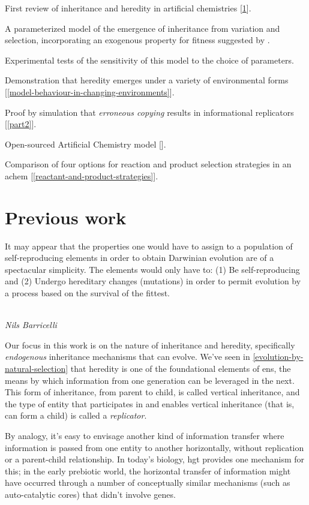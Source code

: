 \begin{compactenum}
\item First review of inheritance and heredity in artificial chemistries [\cref{previous-work}].
\item A parameterized model of the emergence of inheritance from variation and selection, incorporating an exogenous property for fitness suggested by \textcite{Bourrat2015}.
\item Experimental tests of the sensitivity of this model to the choice of parameters.
\item Demonstration that heredity emerges under a variety of environmental forms [\cref{model-behaviour-in-changing-environments}].
\item Proof by simulation that \emph{erroneous copying} \parencite{Zachar2010} results in informational replicators [\cref{part2}].
\item Open-sourced Artificial Chemistry model [\cite{toyworld}].
\item Comparison of four options for reaction and product selection strategies in an \gls{achem} [\cref{reactant-and-product-strategies}].
\end{compactenum}

\chapter{Previous work}\label{previous-work}

\epigraph{%
It may appear that the properties one would have to assign to a population of self-reproducing elements in order to obtain Darwinian evolution are of a spectacular simplicity. The elements would only have to: (1) Be self-reproducing and (2) Undergo hereditary changes (mutations) in order to permit evolution by a process based on the survival of the fittest.}%
{\textit{\\Nils Barricelli}}

Our focus in this work is on the nature of inheritance and heredity, specifically \emph{endogenous} inheritance mechanisms that can evolve. We’ve seen in \cref{evolution-by-natural-selection} that heredity is one of the foundational elements of \gls{ens}, the means by which information from one generation can be leveraged in the next. This form of inheritance, from parent to child, is called vertical inheritance, and the type of entity that participates in and enables vertical inheritance (that is, can form a child) is called a \emph{replicator}. 

By analogy, it’s easy to envisage another kind of information transfer where information is passed from one entity to another horizontally, without replication or a parent-child relationship. In today’s biology, \gls{hgt} provides one mechanism for this; in the early prebiotic world, the horizontal transfer of information might have occurred through a number of conceptually similar mechanisms (such as auto-catalytic cores) that didn’t involve genes. 

